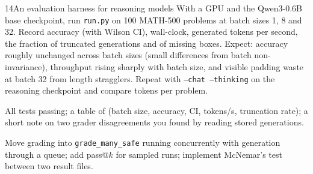 \begin{labbox}{14}{An evaluation harness for reasoning models}
With a GPU and the Qwen3-0.6B base checkpoint, run \texttt{run.py} on 100 MATH-500 problems at
batch sizes 1, 8 and 32. Record accuracy (with Wilson CI), wall-clock, generated tokens per second,
the fraction of truncated generations and of missing boxes. Expect: accuracy roughly unchanged
across batch sizes (small differences from batch non-invariance), throughput rising sharply with
batch size, and visible padding waste at batch 32 from length stragglers. Repeat with
\texttt{--chat --thinking} on the reasoning checkpoint and compare tokens per problem.

All tests passing; a table of (batch size, accuracy, CI, tokens/s, truncation rate); a short note
on two grader disagreements you found by reading stored generations.

Move grading into \texttt{grade\_many\_safe} running concurrently with generation through a queue;
add pass@$k$ for sampled runs; implement McNemar's test between two result files.
\end{labbox}
